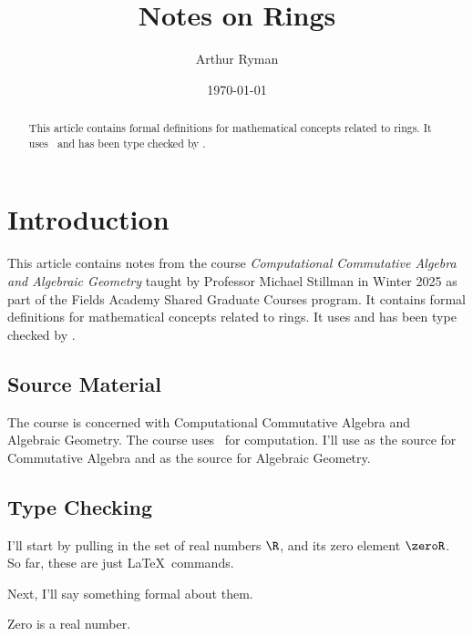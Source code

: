 \documentclass{amsart}
\begin{document}
\title{Notes on Rings}
\author{Arthur Ryman}
\date{\today}

\begin{abstract}
    This article contains formal definitions for mathematical concepts related to rings.
    It uses \ZN\ and has been type checked by \fuzz.
\end{abstract}

\maketitle

\tableofcontents

\section{Introduction}

This article contains notes from the course \textit{Computational Commutative Algebra and Algebraic Geometry}
taught by Professor Michael Stillman in Winter 2025 as part of the Fields Academy Shared Graduate Courses
program.
It contains formal definitions for mathematical concepts related to rings.
It uses \ZN\cite{spivey-zrm} and has been type checked by \fuzz\cite{spivey-fm}.

\subsection{Source Material}

The course is concerned with Computational Commutative Algebra and Algebraic Geometry.
The course uses \mzMtwo\ for computation.
I'll use \cite{atiyah-itca} as the source for Commutative Algebra
and \cite{hartshorne-ag} as the source for Algebraic Geometry.

\subsection{Type Checking}

I'll start by pulling in the set of real numbers $\R$, and its zero element $\zeroR$.
So far, these are just \LaTeX\ commands.

Next, I'll say something formal about them.

\begin{remark}
Zero is a real number.
\begin{zed}
	\zeroR \in \R
\end{zed}
\end{remark}
\end{document}

